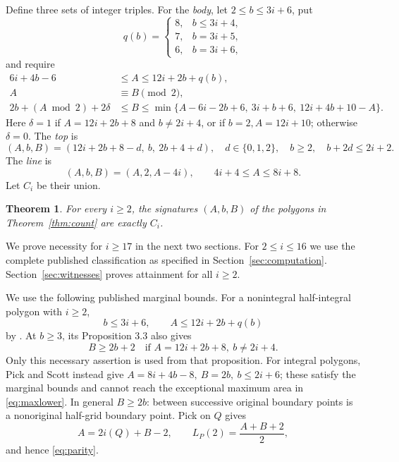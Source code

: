 \documentclass[11pt]{article}
\newtheorem{theorem}{Theorem}[section]
\begin{document}
Define three sets of integer triples. For the \emph{body}, let
\(2\le b\le3i+6\), put
\[
 q(b)=
 \begin{cases}8,&b\le3i+4,\\7,&b=3i+5,\\6,&b=3i+6,\end{cases}
\]
and require
\begin{align}
 6i+4b-6&\le A\le12i+2b+q(b),\label{eq:bodyA}\\
 A&\equiv B\pmod2,\label{eq:parity}\\
 2b+(A\bmod2)+2\delta&\le B
 \le\min\{A-6i-2b+6,\ 3i+b+6,\ 12i+4b+10-A\}.\label{eq:bodyB}
\end{align}
Here \(\delta=1\) if \(A=12i+2b+8\) and \(b\ne2i+4\), or if
\(b=2,A=12i+10\); otherwise \(\delta=0\).
The \emph{top} is
\begin{equation}\label{eq:topset}
 (A,b,B)=(12i+2b+8-d,\ b,\ 2b+4+d),\quad
 d\in\{0,1,2\},\quad b\ge2,\quad b+2d\le2i+2.
\end{equation}
The \emph{line} is
\begin{equation}\label{eq:lineset}
 (A,b,B)=(A,2,A-4i),\qquad 4i+4\le A\le8i+8.
\end{equation}
Let \(C_i\) be their union.
\begin{theorem}\label{thm:signatures}
For every \(i\ge2\), the signatures \((A,b,B)\) of the polygons in
Theorem~\ref{thm:count} are exactly \(C_i\).
\end{theorem}
We prove necessity for \(i\ge17\) in the next two sections. For
\(2\le i\le16\) we use the complete published classification as specified in
Section~\ref{sec:computation}. Section~\ref{sec:witnesses} proves attainment
for all \(i\ge2\).

We use the following published marginal bounds. For a nonintegral
half-integral polygon with \(i\ge2\),
\begin{equation}\label{eq:marginal}
 b\le3i+6,\qquad A\le12i+2b+q(b)
\end{equation}
by \cite[Theorems 1.1 and 1.4]{Inequalities}. At \(b\ge3\), its
Proposition 3.3 also gives
\begin{equation}\label{eq:maxlower}
 B\ge2b+2\quad\text{if }A=12i+2b+8,\ b\ne2i+4.
\end{equation}
Only this necessary assertion is used from that proposition.
For integral polygons, Pick and Scott instead give
\(A=8i+4b-8,\ B=2b,\ b\le2i+6\); these satisfy the marginal bounds
and cannot reach the exceptional maximum area in \eqref{eq:maxlower}.
In general \(B\ge2b\): between successive original boundary points is a
nonoriginal half-grid boundary point. Pick on \(Q\) gives
\begin{equation}\label{eq:pickQ}
 A=2i(Q)+B-2,\qquad L_P(2)=\frac{A+B+2}{2},
\end{equation}
and hence \eqref{eq:parity}.
\end{document}

